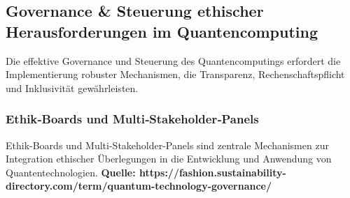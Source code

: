 \subsection{Governance \& Steuerung ethischer Herausforderungen im Quantencomputing}
Die effektive Governance und Steuerung des Quantencomputings erfordert die Implementierung robuster Mechanismen, die Transparenz, Rechenschaftspflicht und Inklusivität gewährleisten.

\subsubsection{Ethik‑Boards und Multi‑Stakeholder‑Panels}
Ethik-Boards und Multi-Stakeholder-Panels sind zentrale Mechanismen zur Integration ethischer Überlegungen in die Entwicklung und Anwendung von Quantentechnologien. \textbf{Quelle: https://fashion.sustainability-directory.com/term/quantum-technology-governance/}

